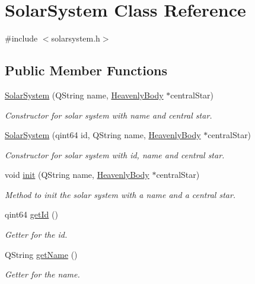 \hypertarget{classSolarSystem}{
\section{\-Solar\-System \-Class \-Reference}
\label{df/d5e/classSolarSystem}
}


{\ttfamily \#include $<$solarsystem.\-h$>$}

\subsection*{\-Public \-Member \-Functions}
\begin{DoxyCompactItemize}
\item 
\hyperlink{classSolarSystem_acd1c223637e498a57d8cee6593f69137}{\-Solar\-System} (\-Q\-String name, \hyperlink{classHeavenlyBody}{\-Heavenly\-Body} $\ast$central\-Star)
\begin{DoxyCompactList}\small\item\em \-Constructor for solar system with name and central star. \end{DoxyCompactList}\item 
\hyperlink{classSolarSystem_afa3e85e6ab9fbe04e2cb80dc02c69dfc}{\-Solar\-System} (qint64 id, \-Q\-String name, \hyperlink{classHeavenlyBody}{\-Heavenly\-Body} $\ast$central\-Star)
\begin{DoxyCompactList}\small\item\em \-Constructor for solar system with id, name and central star. \end{DoxyCompactList}\item 
void \hyperlink{classSolarSystem_a051c4da538ac4a9495e775e60855786e}{init} (\-Q\-String name, \hyperlink{classHeavenlyBody}{\-Heavenly\-Body} $\ast$central\-Star)
\begin{DoxyCompactList}\small\item\em \-Method to init the solar system with a name and a central star. \end{DoxyCompactList}\item 
qint64 \hyperlink{classSolarSystem_a6d73dac11e01ecf06906ede55e8b77fc}{get\-Id} ()
\begin{DoxyCompactList}\small\item\em \-Getter for the id. \end{DoxyCompactList}\item 
\-Q\-String \hyperlink{classSolarSystem_a46abe6f8ea2f1db709d3fac9f1bbf00d}{get\-Name} ()
\begin{DoxyCompactList}\small\item\em \-Getter for the name. \end{DoxyCompactList}\item 

\end{DoxyCompactItemize}
